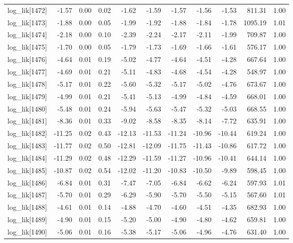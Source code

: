 \begin{table}[ht]
\begin{tabular}{rrrrrrrrrrr}
  log\_lik[1472] & -1.57 & 0.00 & 0.02 & -1.62 & -1.59 & -1.57 & -1.56 & -1.53 & 811.31 & 1.00 \\ 
  log\_lik[1473] & -1.88 & 0.00 & 0.05 & -1.99 & -1.92 & -1.88 & -1.84 & -1.78 & 1095.19 & 1.01 \\ 
  log\_lik[1474] & -2.18 & 0.00 & 0.10 & -2.39 & -2.24 & -2.17 & -2.11 & -1.99 & 709.87 & 1.00 \\ 
  log\_lik[1475] & -1.70 & 0.00 & 0.05 & -1.79 & -1.73 & -1.69 & -1.66 & -1.61 & 576.17 & 1.00 \\ 
  log\_lik[1476] & -4.64 & 0.01 & 0.19 & -5.02 & -4.77 & -4.64 & -4.51 & -4.28 & 667.64 & 1.00 \\ 
  log\_lik[1477] & -4.69 & 0.01 & 0.21 & -5.11 & -4.83 & -4.68 & -4.54 & -4.28 & 548.97 & 1.00 \\ 
  log\_lik[1478] & -5.17 & 0.01 & 0.22 & -5.60 & -5.32 & -5.17 & -5.02 & -4.76 & 673.67 & 1.00 \\ 
  log\_lik[1479] & -4.99 & 0.01 & 0.21 & -5.41 & -5.13 & -4.99 & -4.84 & -4.59 & 668.01 & 1.00 \\ 
  log\_lik[1480] & -5.48 & 0.01 & 0.24 & -5.94 & -5.63 & -5.47 & -5.32 & -5.03 & 668.55 & 1.00 \\ 
  log\_lik[1481] & -8.36 & 0.01 & 0.33 & -9.02 & -8.58 & -8.35 & -8.14 & -7.72 & 635.91 & 1.00 \\ 
  log\_lik[1482] & -11.25 & 0.02 & 0.43 & -12.13 & -11.53 & -11.24 & -10.96 & -10.44 & 619.24 & 1.00 \\ 
  log\_lik[1483] & -11.77 & 0.02 & 0.50 & -12.81 & -12.09 & -11.75 & -11.43 & -10.86 & 617.72 & 1.00 \\ 
  log\_lik[1484] & -11.29 & 0.02 & 0.48 & -12.29 & -11.59 & -11.27 & -10.96 & -10.41 & 644.14 & 1.00 \\ 
  log\_lik[1485] & -10.87 & 0.02 & 0.54 & -12.02 & -11.20 & -10.83 & -10.50 & -9.89 & 598.45 & 1.00 \\ 
  log\_lik[1486] & -6.84 & 0.01 & 0.31 & -7.47 & -7.05 & -6.84 & -6.62 & -6.24 & 597.93 & 1.01 \\ 
  log\_lik[1487] & -5.70 & 0.01 & 0.29 & -6.29 & -5.90 & -5.70 & -5.50 & -5.15 & 567.60 & 1.01 \\ 
  log\_lik[1488] & -4.61 & 0.01 & 0.14 & -4.88 & -4.70 & -4.60 & -4.51 & -4.35 & 682.93 & 1.00 \\ 
  log\_lik[1489] & -4.90 & 0.01 & 0.15 & -5.20 & -5.00 & -4.90 & -4.80 & -4.62 & 659.81 & 1.00 \\ 
  log\_lik[1490] & -5.06 & 0.01 & 0.16 & -5.38 & -5.17 & -5.06 & -4.96 & -4.76 & 631.40 & 1.00 \\ 

\end{tabular}
\end{table}
